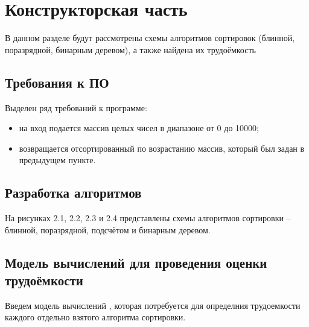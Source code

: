 \chapter{Конструкторская часть}
В данном разделе будут рассмотрены схемы алгоритмов сортировок (блинной, поразрядной, бинарным деревом), а также найдена их трудоёмкость

\section{Требования к ПО}
Выделен ряд требований к программе:
\begin{itemize}
	\item на вход подается массив целых чисел в диапазоне от 0 до 10000;
    \item возвращается отсортированный по возрастанию массив, который был задан в предыдущем пункте. \newline
\end{itemize}

\section{Разработка алгоритмов}
На рисунках 2.1, 2.2, 2.3 и 2.4 представлены схемы алгоритмов сортировки -- блинной, поразрядной, подсчётом и бинарным деревом.

\clearpage

\section{Модель вычислений для проведения оценки трудоёмкости}
Введем модель вычислений \cite{model}, которая потребуется для определния трудоемкости каждого отдельно взятого алгоритма сортировки.

